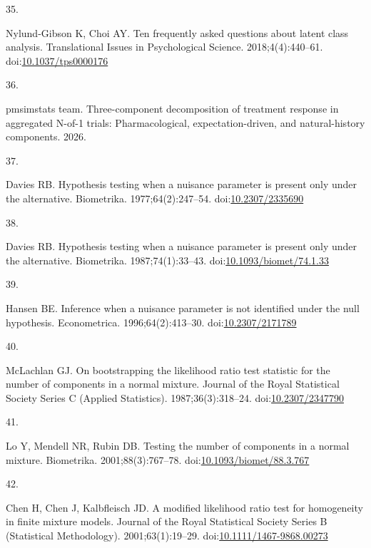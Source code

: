 \documentclass[
  11pt,
]{article}
\newlength{\cslhangindent}
\newlength{\csllabelwidth}
\newenvironment{CSLReferences}[2] %
 {\begin{list}{}{%
  \setlength{\itemindent}{0pt}
  \setlength{\leftmargin}{0pt}
  \setlength{\parsep}{0pt}
  \ifodd #1
   \setlength{\leftmargin}{\cslhangindent}
   \setlength{\itemindent}{-1\cslhangindent}
  \fi
  \setlength{\itemsep}{#2\baselineskip}}}
 {\end{list}}
\newcommand{\CSLLeftMargin}[1]{\parbox[t]{\csllabelwidth}{\strut#1\strut}}
\newcommand{\CSLRightInline}[1]{\parbox[t]{\linewidth - \csllabelwidth}{\strut#1\strut}}
\begin{document}
\begin{CSLReferences}{0}{1}
\CSLLeftMargin{35. }%
\CSLRightInline{Nylund-Gibson K, Choi AY. Ten frequently asked questions about latent class analysis. Translational Issues in Psychological Science. 2018;4(4):440--61. doi:\href{https://doi.org/10.1037/tps0000176}{10.1037/tps0000176}}

\CSLLeftMargin{36. }%
\CSLRightInline{{pmsimstats team}. Three-component decomposition of treatment response in aggregated {N}-of-1 trials: Pharmacological, expectation-driven, and natural-history components. 2026.}

\CSLLeftMargin{37. }%
\CSLRightInline{Davies RB. Hypothesis testing when a nuisance parameter is present only under the alternative. Biometrika. 1977;64(2):247--54. doi:\href{https://doi.org/10.2307/2335690}{10.2307/2335690}}

\CSLLeftMargin{38. }%
\CSLRightInline{Davies RB. Hypothesis testing when a nuisance parameter is present only under the alternative. Biometrika. 1987;74(1):33--43. doi:\href{https://doi.org/10.1093/biomet/74.1.33}{10.1093/biomet/74.1.33}}

\CSLLeftMargin{39. }%
\CSLRightInline{Hansen BE. Inference when a nuisance parameter is not identified under the null hypothesis. Econometrica. 1996;64(2):413--30. doi:\href{https://doi.org/10.2307/2171789}{10.2307/2171789}}

\CSLLeftMargin{40. }%
\CSLRightInline{McLachlan GJ. On bootstrapping the likelihood ratio test statistic for the number of components in a normal mixture. Journal of the Royal Statistical Society Series C (Applied Statistics). 1987;36(3):318--24. doi:\href{https://doi.org/10.2307/2347790}{10.2307/2347790}}

\CSLLeftMargin{41. }%
\CSLRightInline{Lo Y, Mendell NR, Rubin DB. Testing the number of components in a normal mixture. Biometrika. 2001;88(3):767--78. doi:\href{https://doi.org/10.1093/biomet/88.3.767}{10.1093/biomet/88.3.767}}

\CSLLeftMargin{42. }%
\CSLRightInline{Chen H, Chen J, Kalbfleisch JD. A modified likelihood ratio test for homogeneity in finite mixture models. Journal of the Royal Statistical Society Series B (Statistical Methodology). 2001;63(1):19--29. doi:\href{https://doi.org/10.1111/1467-9868.00273}{10.1111/1467-9868.00273}}


\end{CSLReferences}
\end{document}
